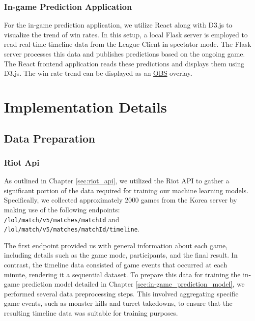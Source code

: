 \documentclass[11pt,a4paper,oneside]{report}
\begin{document}
\subsection{In-game Prediction Application}

For the in-game prediction application, we utilize React along with D3.js \cite{d3} to visualize the trend of win rates. In this setup, a local Flask \cite{flask} server is employed to read real-time timeline data from the League Client in spectator mode. The Flask server processes this data and publishes predictions based on the ongoing game. The React frontend application reads these predictions and displays them using D3.js. The win rate trend can be displayed as an \href{https://obsproject.com/}{OBS} overlay.


\chapter{Implementation Details}
\label{implementation_details}

\section{Data Preparation}
\label{sec:data_preparation}
\subsection{Riot Api}

As outlined in Chapter \ref{sec:riot_api}, we utilized the Riot API to gather a significant portion of the data required for training our machine learning models. Specifically, we collected approximately 2000 games from the Korea server by making use of the following endpoints: \\ \texttt{/lol/match/v5/matches/{matchId}} and \texttt{/lol/match/v5/matches/{matchId}/timeline}.

The first endpoint provided us with general information about each game, including details such as the game mode, participants, and the final result. In contrast, the timeline data consisted of game events that occurred at each minute, rendering it a sequential dataset. To prepare this data for training the in-game prediction model detailed in Chapter \ref{sec:in-game_prediction_model}, we performed several data preprocessing steps. This involved aggregating specific game events, such as monster kills and turret takedowns, to ensure that the resulting timeline data was suitable for training purposes.
\end{document}
